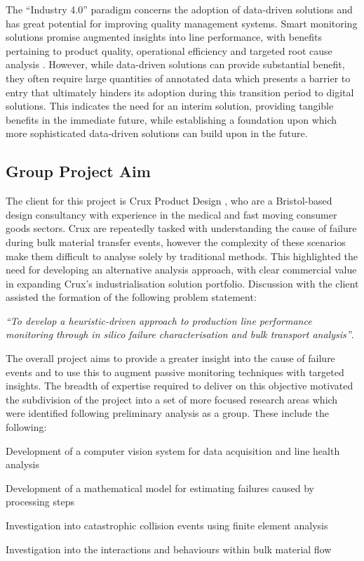 \documentclass[10pt]{article}
\begin{document}
The ``Industry 4.0'' paradigm concerns the adoption of data-driven solutions and has great potential for improving quality management systems. Smart monitoring solutions promise augmented insights into line performance, with benefits pertaining to product quality, operational efficiency and targeted root cause analysis \cite{miller_2018}. However, while data-driven solutions can provide substantial benefit, they often require large quantities of annotated data which presents a barrier to entry that ultimately hinders its adoption during this transition period to digital solutions. This indicates the need for an interim solution, providing tangible benefits in the immediate future, while establishing a foundation upon which more sophisticated data-driven solutions can build upon in the future.

\subsection{Group Project Aim}
The client for this project is Crux Product Design \cite{crux}, who are a Bristol-based design consultancy with experience in the medical and fast moving consumer goods sectors. Crux are repeatedly tasked with understanding the cause of failure during bulk material transfer events, however the complexity of these scenarios make them difficult to analyse solely by traditional methods. This highlighted the need for developing an alternative analysis approach, with clear commercial value in expanding Crux's industrialisation solution portfolio. Discussion with the client assisted the formation of the following problem statement:

\begin{adjustwidth}{1cm}{}
\textit{``To develop a heuristic-driven approach to production line performance monitoring through in silico failure characterisation and bulk transport analysis''}.
\end{adjustwidth}

\noindent The overall project aims to provide a greater insight into the cause of failure events and to use this to augment passive monitoring techniques with targeted insights. The breadth of expertise required to deliver on this objective motivated the subdivision of the project into a set of more focused research areas which were identified following preliminary analysis as a group. These include the following:

\begin{compactenum}
    \item Development of a computer vision system for data acquisition and line health analysis
    \item Development of a mathematical model for estimating failures caused by processing steps
    \item Investigation into catastrophic collision events using finite element analysis
    \item Investigation into the interactions and behaviours within bulk material flow
\end{compactenum}
\end{document}
